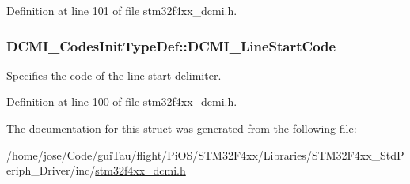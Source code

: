 Definition at line 101 of file stm32f4xx\-\_\-dcmi.\-h.

\hypertarget{struct_d_c_m_i___codes_init_type_def_a52df641c10fe4fb79eefa2db68c65f49}{
\subsubsection[{D\-C\-M\-I\-\_\-\-Line\-Start\-Code}]{ D\-C\-M\-I\-\_\-\-Codes\-Init\-Type\-Def\-::\-D\-C\-M\-I\-\_\-\-Line\-Start\-Code}}\label{struct_d_c_m_i___codes_init_type_def_a52df641c10fe4fb79eefa2db68c65f49}
Specifies the code of the line start delimiter. 

Definition at line 100 of file stm32f4xx\-\_\-dcmi.\-h.



The documentation for this struct was generated from the following file\-:\begin{DoxyCompactItemize}
\item 
/home/jose/\-Code/gui\-Tau/flight/\-Pi\-O\-S/\-S\-T\-M32\-F4xx/\-Libraries/\-S\-T\-M32\-F4xx\-\_\-\-Std\-Periph\-\_\-\-Driver/inc/\hyperlink{stm32f4xx__dcmi_8h}{stm32f4xx\-\_\-dcmi.\-h}\end{DoxyCompactItemize}
